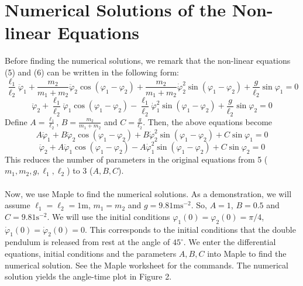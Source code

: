 \documentclass[11pt]{article}
\begin{document}
\section{Numerical Solutions of the Non-linear Equations}
Before finding the numerical solutions, we remark that the non-linear equations (5) and (6) can be written in the following form:
\begin{equation*}
  \frac{\ell_1}{\ell_2} \ddot{\varphi}_1 + \frac{m_2}{m_1+m_2}  \ddot{\varphi}_2\cos(\varphi_1 - \varphi_2)
  + \frac{m_2}{m_1+m_2}\dot{\varphi}_2^2 \sin(\varphi_1 - \varphi_2) + \frac{g}{\ell_2} \sin\varphi_1 = 0
\end{equation*}
\begin{equation*}
   \ddot{\varphi}_2 +  \frac{\ell_1}{\ell_2}\ddot{\varphi}_1\cos(\varphi_1-\varphi_2)
  -
    \frac{\ell_1}{\ell_2}\dot{\varphi}_1^2\sin(\varphi_1-\varphi_2) +  \frac{g}{\ell_2} \sin\varphi_2 = 0
\end{equation*}
Define \(A = \frac{\ell_1}{\ell_2}\), \(B = \frac{m_2}{m_1+m_2}\) and \(C = \frac{g}{\ell_2}\). Then, the above equations
become
\begin{equation}
  A\ddot{\varphi}_1 + B  \ddot{\varphi}_2\cos(\varphi_1 - \varphi_2)
  + B\dot{\varphi}_2^2 \sin(\varphi_1 - \varphi_2) + C \sin\varphi_1 = 0
\end{equation}
\begin{equation}
  \ddot{\varphi}_2 +  A\ddot{\varphi}_1\cos(\varphi_1-\varphi_2)
 -
   A\dot{\varphi}_1^2\sin(\varphi_1-\varphi_2) +  C \sin\varphi_2 = 0
\end{equation}
This reduces the number of parameters in the original equations from 5 (\(m_1, m_2, g, \ell_1, \ell_2\)) to 3 (\(A, B, C\)). \\
\\
Now, we use Maple to find the numerical solutions. As a demonstration, we will assume \(\ell_1=\ell_2=1\mathrm{m}\), \(m_1=m_2\)
and \(g = 9.81 \mathrm{ms}^{-2}\). So, \(A = 1\), \(B= 0.5\) and \(C = 9.81 \mathrm{s}^{-2}\).
We will use the initial conditions \(\varphi_1(0) = \varphi_2(0) = \pi/4\), \(\dot{\varphi}_1(0) = \dot{\varphi}_2(0) = 0\).
This corresponds to the initial conditions that the double pendulum is released from rest at the angle of \(45^\circ\).
We enter the differential equations, initial conditions
and the parameters \(A,B,C\) into Maple to find the numerical solution. See the Maple worksheet for the commands. The numerical
solution yields the angle-time plot in Figure 2. \\
\\
\end{document}

